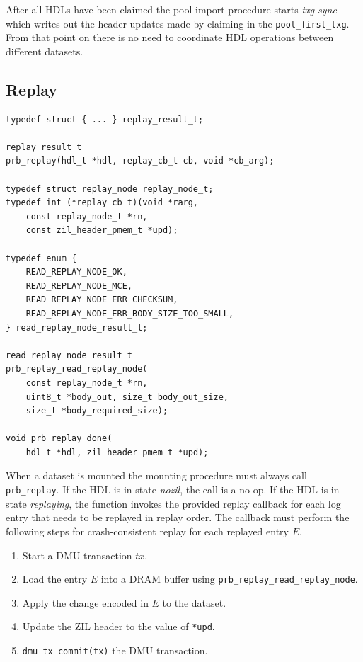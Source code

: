\documentclass[12pt,a4paper,twoside]{book}
\begin{document}
After all HDLs have been claimed the pool import procedure starts \textit{txg sync} which writes out the header updates made by claiming in the \lstinline{pool_first_txg}.
From that point on there is no need to coordinate HDL operations between different datasets.


\subsection{Replay}\label{di:prb:api:replay}

\begin{lstlisting}
typedef struct { ... } replay_result_t;

replay_result_t
prb_replay(hdl_t *hdl, replay_cb_t cb, void *cb_arg);

typedef struct replay_node replay_node_t;
typedef int (*replay_cb_t)(void *rarg,
    const replay_node_t *rn,
    const zil_header_pmem_t *upd);

typedef enum {
	READ_REPLAY_NODE_OK,
	READ_REPLAY_NODE_MCE,
	READ_REPLAY_NODE_ERR_CHECKSUM,
	READ_REPLAY_NODE_ERR_BODY_SIZE_TOO_SMALL,
} read_replay_node_result_t;

read_replay_node_result_t
prb_replay_read_replay_node(
    const replay_node_t *rn,
    uint8_t *body_out, size_t body_out_size,
    size_t *body_required_size);

void prb_replay_done(
    hdl_t *hdl, zil_header_pmem_t *upd);

\end{lstlisting}

When a dataset is mounted the mounting procedure must always call \lstinline{prb_replay}.
If the HDL is in state \textit{nozil}, the call is a no-op.
If the HDL is in state \textit{replaying}, the function invokes the provided replay callback for each log entry that needs to be replayed in replay order.
The callback must perform the following steps for crash-consistent replay for each replayed entry $E$.
\begin{enumerate}[noitemsep]
    \item Start a DMU transaction $tx$.
    \item Load the entry $E$ into a DRAM buffer using \lstinline{prb_replay_read_replay_node}.
    \item Apply the change encoded in $E$ to the dataset.
    \item Update the ZIL header to the value of \lstinline{*upd}.
    \item \lstinline{dmu_tx_commit(tx)} the DMU transaction.
\end{enumerate}
\end{document}
